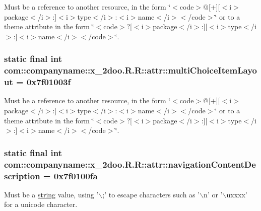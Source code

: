 Must be a reference to another resource, in the form \char`\"{}$<$code$>$@\mbox{[}+\mbox{]}\mbox{[}$<$i$>$package$<$/i$>$:\mbox{]}$<$i$>$type$<$/i$>$:$<$i$>$name$<$/i$>$$<$/code$>$\char`\"{} or to a theme attribute in the form \char`\"{}$<$code$>$?\mbox{[}$<$i$>$package$<$/i$>$:\mbox{]}\mbox{[}$<$i$>$type$<$/i$>$:\mbox{]}$<$i$>$name$<$/i$>$$<$/code$>$\char`\"{}. \hypertarget{classcom_1_1companyname_1_1x__2doo_1_1_r_1_1attr_01c5f4b17d9504d30489cc2cc0add672}{
\subsubsection[{multiChoiceItemLayout}]{\setlength{\rightskip}{0pt plus 5cm}static final int com::companyname::x\_\-2doo.R.R::attr::multiChoiceItemLayout = 0x7f01003f}}
\label{classcom_1_1companyname_1_1x__2doo_1_1_r_1_1attr_01c5f4b17d9504d30489cc2cc0add672}


Must be a reference to another resource, in the form \char`\"{}$<$code$>$@\mbox{[}+\mbox{]}\mbox{[}$<$i$>$package$<$/i$>$:\mbox{]}$<$i$>$type$<$/i$>$:$<$i$>$name$<$/i$>$$<$/code$>$\char`\"{} or to a theme attribute in the form \char`\"{}$<$code$>$?\mbox{[}$<$i$>$package$<$/i$>$:\mbox{]}\mbox{[}$<$i$>$type$<$/i$>$:\mbox{]}$<$i$>$name$<$/i$>$$<$/code$>$\char`\"{}. \hypertarget{classcom_1_1companyname_1_1x__2doo_1_1_r_1_1attr_f7bc08d807cfbde758e79f125fda972a}{
\subsubsection[{navigationContentDescription}]{\setlength{\rightskip}{0pt plus 5cm}static final int com::companyname::x\_\-2doo.R.R::attr::navigationContentDescription = 0x7f0100fa}}
\label{classcom_1_1companyname_1_1x__2doo_1_1_r_1_1attr_f7bc08d807cfbde758e79f125fda972a}


Must be a \hyperlink{classcom_1_1companyname_1_1x__2doo_1_1_r_1_1string}{string} value, using '$\backslash$;' to escape characters such as '$\backslash$n' or '$\backslash$uxxxx' for a unicode character. 

